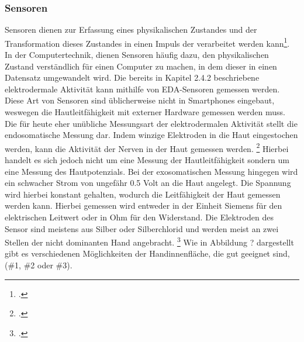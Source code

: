 \subsubsection{Sensoren}
Sensoren dienen zur Erfassung eines physikalischen Zustandes und der Transformation dieses Zustandes in einen Impuls der verarbeitet werden kann\footcite[Vgl.][]{Web18}. In der Computertechnik, dienen Sensoren häufig dazu, den physikalischen Zustand verständlich für einen Computer zu machen, in dem dieser in einen Datensatz umgewandelt wird. \newline 
Die bereits in Kapitel 2.4.2 beschriebene elektrodermale Aktivität kann mithilfe von EDA-Sensoren gemessen werden. Diese Art von Sensoren sind üblicherweise nicht in Smartphones eingebaut, weswegen die Hautleitfähigkeit mit externer Hardware gemessen werden muss. \newline
Die für heute eher unübliche Messungsart der elektrodermalen Aktivität stellt die endosomatische Messung dar. Indem winzige Elektroden in die Haut eingestochen werden, kann die Aktivität der Nerven in der Haut gemessen werden. \footcite[Vgl.][Folie 25]{Sch12} Hierbei handelt es sich jedoch nicht um eine Messung der Hautleitfähigkeit sondern um eine Messung des Hautpotenzials. \newline
Bei der exosomatischen Messung hingegen wird ein schwacher Strom von ungefähr 0.5 Volt an die Haut angelegt. Die Spannung wird hierbei konstant gehalten, wodurch die Leitfähigkeit der Haut gemessen werden kann. Hierbei gemessen wird entweder in der Einheit Siemens für den elektrischen Leitwert oder in Ohm für den Widerstand. Die Elektroden des Sensor sind meistens aus Silber oder Silberchlorid und werden meist an zwei Stellen der nicht dominanten Hand angebracht. \footcite[Vgl.][Folie 25]{Sch12} Wie in Abbildung ? dargestellt gibt es verschiedenen Möglichkeiten der Handinnenfläche, die gut geeignet sind, (\#1, \#2 oder \#3). \newline 
